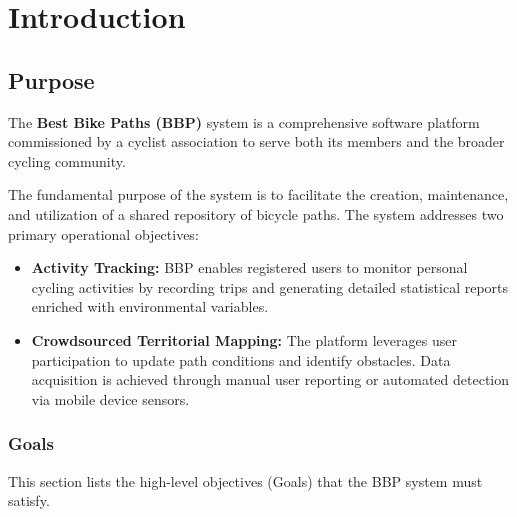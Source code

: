 \section{Introduction} 
\subsection{Purpose}
The \textbf{Best Bike Paths (BBP)} system is a comprehensive software platform commissioned by a cyclist association to serve both its members and the broader cycling community. 

The fundamental purpose of the system is to facilitate the creation, maintenance, and utilization of a shared repository of bicycle paths. The system addresses two primary operational objectives:

\begin{itemize}
    \item \textbf{Activity Tracking:} BBP enables registered users to monitor personal cycling activities by recording trips and generating detailed statistical reports enriched with environmental variables.
    
    \item \textbf{Crowdsourced Territorial Mapping:} The platform leverages user participation to update path conditions and identify obstacles. Data acquisition is achieved through manual user reporting or automated detection via mobile device sensors.
\end{itemize}

\subsubsection{Goals} \label{goals}
This section lists the high-level objectives (Goals) that the BBP system must satisfy.

